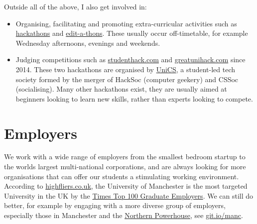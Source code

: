 \documentclass[
  12pt,
]{book}
\providecommand{\tightlist}{%
  \setlength{\itemsep}{0pt}\setlength{\parskip}{0pt}}
\begin{document}
Outside all of the above, I also get involved in:

\begin{itemize}
\tightlist
\item
  Organising, facilitating and promoting extra-curricular activities such as \href{https://en.wikipedia.org/wiki/Hackathon}{hackathons} \citep{Briscoe, Warner2017} and \href{https://en.wikipedia.org/wiki/Edit-a-thon}{edit-a-thons}. \citep{goodbadugly, troubled, findingada2019} These usually occur off-timetable, for example Wednesday afternoons, evenings and weekends.
\item
  Judging competitions such as \href{https://www.studenthack.com}{studenthack.com} and \href{https://greatunihack.com}{greatunihack.com} since 2014. These two hackathons are organised by \href{https://www.unicsmcr.com/}{UniCS}, a student-led tech society formed by the merger of HackSoc (computer geekery) and CSSoc (socialising). Many other hackathons exist, they are usually aimed at beginners looking to learn new skills, rather than experts looking to compete. \citep{Briscoe, hafb}
\end{itemize}

\hypertarget{employers}{%
\chapter{Employers}\label{employers}}

We work with a wide range of employers from the smallest bedroom startup to the worlds largest multi-national corporations, and are always looking for more organisations that can offer our students a stimulating working environment. According to \href{https://www.highfliers.co.uk}{highfliers.co.uk}, the University of Manchester is the most targeted University in the UK by the \href{https://www.top100graduateemployers.com}{Times Top 100 Graduate Employers}. \citep{times100, highfliers2021, highfliers2020, Birchall2019} We can still do better, for example by engaging with a more diverse group of employers, especially those in Manchester and the \href{https://northernpowerhouse.gov.uk/}{Northern Powerhouse}, see \href{https://git.io/manc}{git.io/manc}. \citep{gitmanc, londonvstherest, hebdenbridge, manhattanchester, manchattan}
\end{document}
